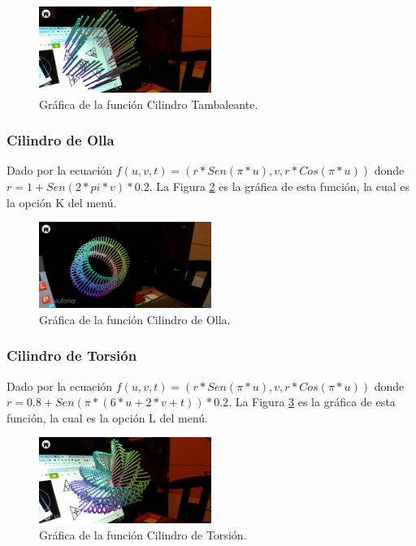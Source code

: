 \begin{figure}[hbt!]
\centering
\includegraphics[width=0.5\textwidth]{figuras/graficas/cilindro_tambaleante.png}
\caption{\label{fig:graf_cilindro_tambaleante}Gráfica de la función Cilindro Tambaleante.}
\end{figure}
\FloatBarrier

\subsubsection{Cilindro de Olla}
Dado por la ecuación $f(u,v,t)=(r*Sen(\pi * u), v, r*Cos(\pi * u))$ donde $r = 1 + Sen(2 * pi * v) * 0.2$. La Figura \ref{fig:graf_cilindro_olla} es la gráfica de esta función, la cual es la opción K del menú.

\begin{figure}[hbt!]
\centering
\includegraphics[width=0.5\textwidth]{figuras/graficas/cilindro_olla.png}
\caption{\label{fig:graf_cilindro_olla}Gráfica de la función Cilindro de Olla.}
\end{figure}
\FloatBarrier

\subsubsection{Cilindro de Torsión}
Dado por la ecuación $f(u,v,t)=(r*Sen(\pi * u), v, r*Cos(\pi * u))$ donde $r = 0.8 + Sen(\pi * (6 * u + 2 * v + t)) * 0.2$. La Figura \ref{fig:graf_cilindro_torsion} es la gráfica de esta función, la cual es la opción L del menú.

\begin{figure}[hbt!]
\centering
\includegraphics[width=0.5\textwidth]{figuras/graficas/cilindro_torsion.png}
\caption{\label{fig:graf_cilindro_torsion}Gráfica de la función Cilindro de Torsión.}
\end{figure}
\FloatBarrier

